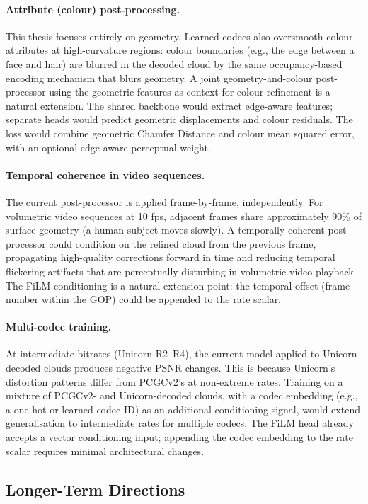 \paragraph{Attribute (colour) post-processing.}
This thesis focuses entirely on geometry.
Learned codecs also oversmooth colour attributes at high-curvature regions:
colour boundaries (e.g., the edge between a face and hair) are blurred in
the decoded cloud by the same occupancy-based encoding mechanism that blurs
geometry.
A joint geometry-and-colour post-processor using the geometric features as
context for colour refinement is a natural extension.
The shared backbone would extract edge-aware features; separate heads would
predict geometric displacements and colour residuals.
The loss would combine geometric Chamfer Distance and colour mean squared
error, with an optional edge-aware perceptual weight.

\paragraph{Temporal coherence in video sequences.}
The current post-processor is applied frame-by-frame, independently.
For volumetric video sequences at 10 fps, adjacent frames share approximately
90\% of surface geometry (a human subject moves slowly).
A temporally coherent post-processor could condition on the refined cloud
from the previous frame, propagating high-quality corrections forward in time
and reducing temporal flickering artifacts that are perceptually disturbing
in volumetric video playback.
The FiLM conditioning is a natural extension point: the temporal offset (frame
number within the GOP) could be appended to the rate scalar.

\paragraph{Multi-codec training.}
At intermediate bitrates (Unicorn R2--R4), the current model applied to
Unicorn-decoded clouds produces negative PSNR changes.
This is because Unicorn's distortion patterns differ from PCGCv2's at
non-extreme rates.
Training on a mixture of PCGCv2- and Unicorn-decoded clouds, with a codec
embedding (e.g., a one-hot or learned codec ID) as an additional conditioning
signal, would extend generalisation to intermediate rates for multiple codecs.
The FiLM head already accepts a vector conditioning input; appending the
codec embedding to the rate scalar requires minimal architectural changes.

\subsection*{Longer-Term Directions}

